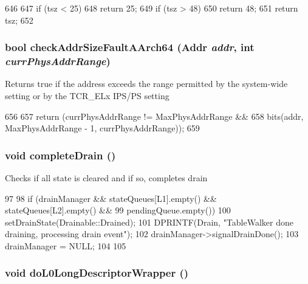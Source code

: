 \begin{DoxyCode}
646 {
647     if (tsz < 25)
648         return 25;
649     if (tsz > 48)
650         return 48;
651     return tsz;
652 }
\end{DoxyCode}
\hypertarget{classArmISA_1_1TableWalker_a40ad630985e7888b542e819ed09e0551}{
\subsubsection[{checkAddrSizeFaultAArch64}]{\setlength{\rightskip}{0pt plus 5cm}bool checkAddrSizeFaultAArch64 ({\bf Addr} {\em addr}, \/  int {\em currPhysAddrRange})}}
\label{classArmISA_1_1TableWalker_a40ad630985e7888b542e819ed09e0551}
Returns true if the address exceeds the range permitted by the system-\/wide setting or by the TCR\_\-ELx IPS/PS setting 


\begin{DoxyCode}
656 {
657     return (currPhysAddrRange != MaxPhysAddrRange &&
658             bits(addr, MaxPhysAddrRange - 1, currPhysAddrRange));
659 }
\end{DoxyCode}
\hypertarget{classArmISA_1_1TableWalker_a5807f306df98d17f68f466ded6d7799f}{
\subsubsection[{completeDrain}]{\setlength{\rightskip}{0pt plus 5cm}void completeDrain ()}}
\label{classArmISA_1_1TableWalker_a5807f306df98d17f68f466ded6d7799f}
Checks if all state is cleared and if so, completes drain 


\begin{DoxyCode}
97 {
98     if (drainManager && stateQueues[L1].empty() && stateQueues[L2].empty() &&
99         pendingQueue.empty()) {
100         setDrainState(Drainable::Drained);
101         DPRINTF(Drain, "TableWalker done draining, processing drain event\n");
102         drainManager->signalDrainDone();
103         drainManager = NULL;
104     }
105 }
\end{DoxyCode}
\hypertarget{classArmISA_1_1TableWalker_a5c436908eca38a39cb98c4dedbf7228c}{
\subsubsection[{doL0LongDescriptorWrapper}]{\setlength{\rightskip}{0pt plus 5cm}void doL0LongDescriptorWrapper ()}}
\label{classArmISA_1_1TableWalker_a5c436908eca38a39cb98c4dedbf7228c}



